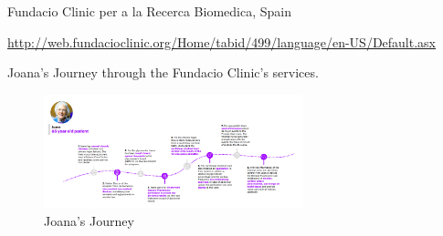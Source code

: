 Fundacio Clinic per a la Recerca Biomedica, Spain

\url{http://web.fundacioclinic.org/Home/tabid/499/language/en-US/Default.asx}



Joana's Journey through the Fundacio Clinic's services.

\begin{figure}
    \centering
    \includegraphics[width=75mm]{images/FCRB-Use-Case.png}
    \caption{Joana's Journey}
    \label{fig:usecasefcrb}
\end{figure}

